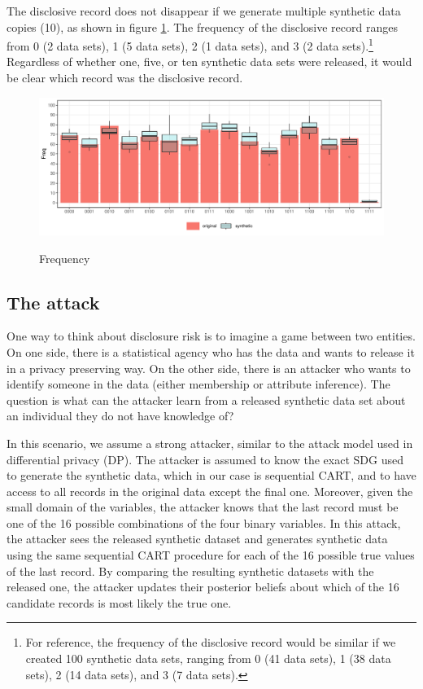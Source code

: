 \documentclass[a4paper,11pt]{style/uneceart}
\begin{document}
The disclosive record does not disappear if we generate multiple synthetic data copies (10), as shown in figure \ref{fig:cart_histogram_compare_10}.  The frequency of the disclosive record ranges from 0 (2 data sets), 1 (5 data sets), 2 (1 data sets), and 3 (2 data sets).\footnote{For reference, the frequency of the disclosive record would be similar if we created 100 synthetic data sets, ranging from 0 (41 data sets), 1 (38 data sets), 2 (14 data sets), and 3 (7 data sets).}  Regardless of whether one, five, or ten synthetic data sets were released, it would be clear which record was the disclosive record.  

\begin{figure}[!h]
    \centering
    \caption{Frequency}
    \includegraphics[width=\textwidth]{../graphs/graph_cart_histogram_compare_10_v1.pdf}
    \label{fig:cart_histogram_compare_10}
\end{figure}


\subsection{The attack}

One way to think about disclosure risk is to imagine a game between two entities.  On one side, there is a statistical agency who has the data and wants to release it in a privacy preserving way.  On the other side, there is an attacker who wants to identify someone in the data (either membership or attribute inference). The question is what can the attacker learn from a released synthetic data set about an individual they do not have knowledge of?

In this scenario, we assume a strong attacker, similar to the attack model used in differential privacy (DP). The attacker is assumed to know the exact SDG used to generate the synthetic data, which in our case is sequential CART, and to have access to all records in the original data except the final one. Moreover, given the small domain of the variables, the attacker knows that the last record must be one of the 16 possible combinations of the four binary variables. In this attack, the attacker sees the released synthetic dataset and generates synthetic data using the same sequential CART procedure for each of the 16 possible true values of the last record. By comparing the resulting synthetic datasets with the released one, the attacker updates their posterior beliefs about which of the 16 candidate records is most likely the true one.
\end{document}
